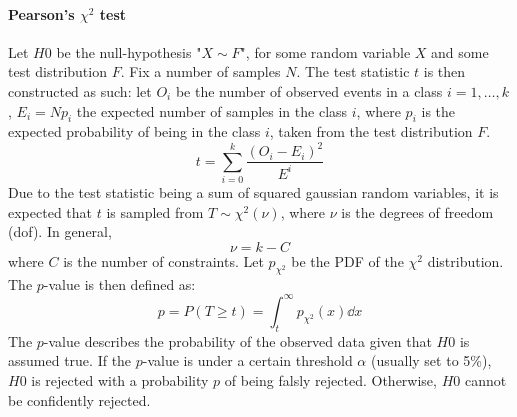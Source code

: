 \paragraph{Pearson's \(\chi^2\) test}
Let \(H0\) be the null-hypothesis "\(X \sim F\)", for some random variable \(X\) and some test distribution \(F\). Fix a number of samples \(N\).
The test statistic \(t\) is then constructed as such: let \(O_i\) be the number of observed events in a class \(i=1,\dots,k\), \(E_i = Np_i\) the expected number of samples in the class \(i\), where \(p_i\) is the expected probability of being in the class \(i\), taken from the test distribution \(F\).
\begin{equation}
    t = \sum_{i=0}^k \frac{(O_i - E_i)^2}{E^i}
\end{equation}
Due to the test statistic being a sum of squared gaussian random variables, it is expected that \(t\) is sampled from \(T \sim \chi^2(\nu)\), where \(\nu\) is the degrees of freedom (dof). In general,
\begin{equation}
    \nu = k-C
\end{equation} 
where \(C\) is the number of constraints. Let \(p_{\chi^2}\) be the PDF of the \(\chi^2\) distribution. The \(p\)-value is then defined as:
\begin{equation}
    p = P(T \ge t) = \int_t^\infty p_{\chi^2}(x) \dd x
\end{equation}
The \(p\)-value describes the probability of the observed data given that \(H0\) is assumed true. If the \(p\)-value is under a certain threshold \(\alpha\) (usually set to 5\%), \(H0\) is rejected with a probability \(p\) of being falsly rejected. Otherwise, \(H0\) cannot be confidently rejected.